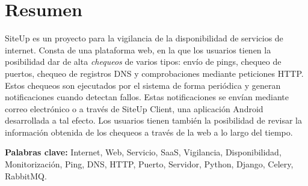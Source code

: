 \section*{Resumen}

SiteUp es un proyecto para la vigilancia de la disponibilidad de servicios de
internet. Consta de una plataforma web, en la que los usuarios tienen la
posibilidad dar de alta \textit{chequeos} de varios tipos: envío de pings,
chequeo de puertos, chequeo de registros DNS y comprobaciones mediante
peticiones HTTP. Estos chequeos son ejecutados por el sistema de forma periódica
y generan notificaciones cuando detectan fallos. Estas notificaciones se envían
mediante correo electrónico o a través de SiteUp Client, una aplicación Android
desarrollada a tal efecto. Los usuarios tienen también la posibilidad de revisar
la información obtenida de los chequeos a través de la web a lo largo del tiempo.

\textbf{Palabras clave:} Internet, Web, Servicio, SaaS, Vigilancia, Disponibilidad,
Monitorización, Ping, DNS, HTTP, Puerto, Servidor, Python, Django, Celery, RabbitMQ.

